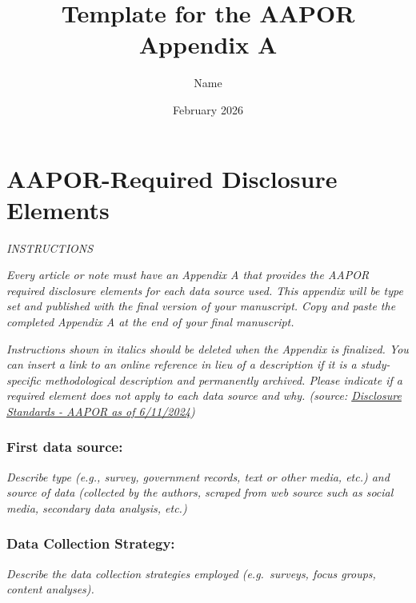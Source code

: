 \documentclass{article}
\title{Template for the AAPOR Appendix A}
\author{Name}
\date{February 2026}
\begin{document}
\maketitle



\renewcommand{\thesection}{\Alph{section}} 

\appendix

\section{AAPOR-Required Disclosure Elements}  


\begin{center}
  \textit{INSTRUCTIONS}  
\end{center}

\textit{Every article or note must have an Appendix A that provides the AAPOR required disclosure elements for each data source used. This appendix will be type set and published with the final version of your manuscript. Copy and paste the completed Appendix A at the end of your final manuscript.}

\textit{Instructions shown in italics should be deleted when the Appendix is finalized. You can insert a link to an online reference in lieu of a description if it is a study-specific methodological description and permanently archived. Please indicate if a required element does not apply to each data source and why. (source: \href{https://aapor.org/standards-and-ethics/disclosure-standards}{Disclosure Standards - AAPOR as of 6/11/2024}) 
}


\subsubsection*{First data source:} \textit{Describe type (e.g., survey, government records, text or other media, etc.) and source of data (collected by the authors, scraped from web source such as social media, secondary data analysis, etc.)}



\subsubsection*{Data Collection Strategy:} \textit{Describe the data collection strategies employed (e.g.\ surveys, focus groups, content analyses).}
\end{document}
